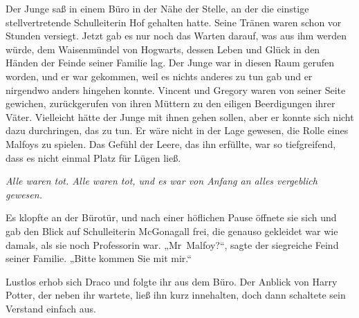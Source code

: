 Der Junge saß in einem Büro in der Nähe der Stelle, an der die einstige stellvertretende Schulleiterin Hof gehalten hatte. Seine Tränen waren schon vor Stunden versiegt. Jetzt gab es nur noch das Warten darauf, was aus ihm werden würde, dem Waisenmündel von Hogwarts, dessen Leben und Glück in den Händen der Feinde seiner Familie lag. Der Junge war in diesen Raum gerufen worden, und er war gekommen, weil es nichts anderes zu tun gab und er nirgendwo anders hingehen konnte. Vincent und Gregory waren von seiner Seite gewichen, zurückgerufen von ihren Müttern zu den eiligen Beerdigungen ihrer Väter. Vielleicht hätte der Junge mit ihnen gehen sollen, aber er konnte sich nicht dazu durchringen, das zu tun. Er wäre nicht in der Lage gewesen, die Rolle eines Malfoys zu spielen. Das Gefühl der Leere, das ihn erfüllte, war so tiefgreifend, dass es nicht einmal Platz für Lügen ließ.

\emph{Alle waren tot. Alle waren tot, und es war von Anfang an alles vergeblich gewesen.}

Es klopfte an der Bürotür, und nach einer höflichen Pause öffnete sie sich und gab den Blick auf Schulleiterin McGonagall frei, die genauso gekleidet war wie damals, als sie noch Professorin war.
„Mr~Malfoy?“, sagte der siegreiche Feind seiner Familie. „Bitte kommen Sie mit mir.“

Lustlos erhob sich Draco und folgte ihr aus dem Büro. Der Anblick von Harry Potter, der neben ihr wartete, ließ ihn kurz innehalten, doch dann schaltete sein Verstand einfach aus.

